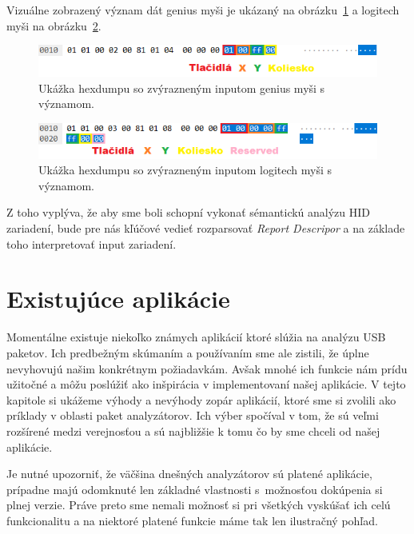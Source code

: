 Vizuálne zobrazený význam dát genius myši je ukázaný na obrázku~\ref{obr:uvod:genius:input:vyznam} a logitech myši na obrázku~\ref{obr:uvod:logitech:input:vyznam}.

\begin{figure}[!htb]
	\centering
	\includegraphics[width=12cm]{img/uvod_genius_input_vyznam}
	\caption{Ukážka hexdumpu so zvýrazneným inputom genius myši s významom.}
	\label{obr:uvod:genius:input:vyznam}
\end{figure}

\begin{figure}[!htb]
	\centering
	\includegraphics[width=12cm]{img/uvod_logitech_input_vyznam}
	\caption{Ukážka hexdumpu so zvýrazneným inputom logitech myši s významom.}
	\label{obr:uvod:logitech:input:vyznam}
\end{figure}

Z toho vyplýva, že aby sme boli schopní vykonať sémantickú analýzu HID zariadení, bude pre nás kľúčové vedieť rozparsovať \textit{Report Descripor} a na základe toho interpretovať input zariadení.

\section{Existujúce aplikácie}
\label{uvod:sec:existujuce_aplikacie}

Momentálne existuje niekoľko známych aplikácií ktoré slúžia na analýzu USB paketov. Ich predbežným skúmaním a používaním sme ale zistili, že úplne nevyhovujú našim konkrétnym požiadavkám. Avšak mnohé ich funkcie nám prídu užitočné a môžu poslúžiť ako inšpirácia v implementovaní našej aplikácie. V tejto kapitole si ukážeme výhody a nevýhody zopár aplikácií, ktoré sme si zvolili ako príklady v oblasti paket analyzátorov. Ich výber spočíval v tom, že sú veľmi rozšírené medzi verejnosťou a sú najbližšie k tomu čo by sme chceli od našej aplikácie.

Je nutné upozorniť, že väčšina dnešných analyzátorov sú platené aplikácie, prípadne majú odomknuté len základné vlastnosti s~možnosťou dokúpenia si plnej verzie. Práve preto sme nemali možnosť si pri všetkých vyskúšať ich celú funkcionalitu a na niektoré platené funkcie máme tak len ilustračný pohľad.


